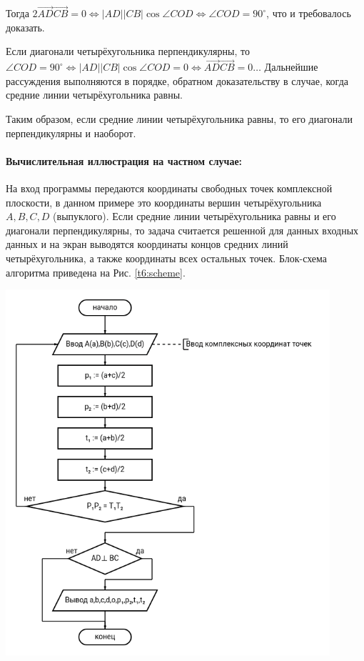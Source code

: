 {   Тогда \(2 \overrightarrow{AD} \overrightarrow{CB} = 0\Leftrightarrow \left\lvert AD\right\rvert
   \left\lvert CB\right\rvert \cos{\angle{COD}} \Leftrightarrow \angle{COD} = 90^\circ\),
   что и требовалось доказать.

   Если диагонали четырёхугольника перпендикулярны, то \(\angle{COD} = 90^\circ \Leftrightarrow \left\lvert AD\right\rvert \left\lvert CB\right\rvert \cos{\angle{COD}} = 0 \Leftrightarrow \overrightarrow{AD}\overrightarrow{CB}=
   0 \dots\)
   Дальнейшие рассуждения выполняются в порядке, обратном доказательству в случае, когда средние линии четырёхугольника равны.

   Таким образом, если средние линии четырёхугольника равны, то его диагонали перпендикулярны и наоборот.
   \paragraph{Вычислительная иллюстрация на частном случае:} На вход программы передаются координаты
   свободных точек комплексной плоскости, в данном примере это координаты вершин четырёхугольника \(A,B,C,D\) (выпуклого).
   Если средние линии четырёхугольника равны и его диагонали перпендикулярны, то задача
   считается решенной для данных входных данных и на экран выводятся координаты концов средних линий четырёхугольника, а также координаты
   всех остальных точек. Блок-схема алгоритма приведена на Рис. \ref{t6:scheme}.
   \begin{center}
      \includegraphics[width=0.9\textwidth]{images/task6-diagram.png}
      \label{t6:scheme}
   \end{center}
}
